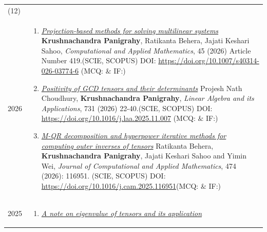 \documentclass[a4paper,12pt]{article}
\begin{document}
\begin{longtable}{lp{15cm}}
\multicolumn{2}{l}{\color{pub}{\textsc{Published}}(12)}\\[0.2cm]
\textsc{2026}&
\vspace{-0.3cm}
\begin{enumerate}[series=pubs]
\item \href{https://doi.org/10.1007/s40314-026-03774-6}{\it Projection-based methods for solving multilinear systems}\newline
{\footnotesize
{\bf Krushnachandra Panigrahy}, Ratikanta Behera, Jajati Keshari Sahoo,\newline
\textcolor{source}{\it Computational and Applied Mathematics}, 45 (2026) Article Number 419.\hfill{(SCIE, SCOPUS)} \newline
DOI: \href{https://doi.org/10.1007/s40314-026-03774-6}{https://doi.org/10.1007/s40314-026-03774-6} \hfill(MCQ:  $\&$ IF:)
}
\item \href{ https://doi.org/10.21136/AM.2025.0022-25}{\it Positivity of GCD tensors and their determinants}\newline
{\footnotesize
Projesh Nath Choudhury, {\bf Krushnachandra Panigrahy},\newline
\textcolor{source}{\it Linear Algebra and its Applications}, 731 (2026) 22-40.\hfill{(SCIE, SCOPUS)} \newline
DOI: \href{https://doi.org/10.1016/j.laa.2025.11.007}{https://doi.org/10.1016/j.laa.2025.11.007} \hfill(MCQ:  $\&$ IF:)
}
\item \href{https://doi.org/10.1016/j.cam.2025.116951}{\it M-QR decomposition and hyperpower iterative methods for computing outer inverses of tensors}\newline
{\footnotesize
Ratikanta Behera, {\bf Krushnachandra Panigrahy}, Jajati Keshari Sahoo and Yimin Wei,\newline
\textcolor{source}{\it Journal of Computational and Applied Mathematics}, 474 (2026): 116951. \hfill{(SCIE, SCOPUS)}\newline
DOI: \href{https://doi.org/10.1016/j.cam.2025.116951}{https://doi.org/10.1016/j.cam.2025.116951}\hfill(MCQ:  $\&$ IF:)
}
\end{enumerate}\\
\textsc{2025}&
\vspace{-0.3cm}
\begin{enumerate}[resume=pubs]
\item  \href{ https://doi.org/10.21136/AM.2025.0022-25}{\it A note on eigenvalue of tensors and its application}\newline

\end{enumerate}
\end{longtable}
\end{document}
